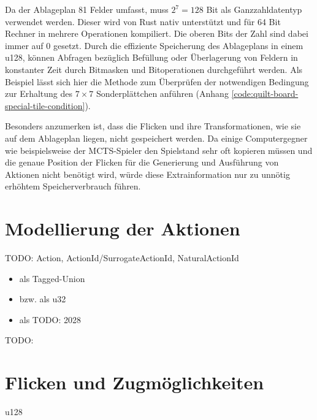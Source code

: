 Da der Ablageplan 81 Felder umfasst, muss $2^7=128$ Bit als Ganzzahldatentyp verwendet werden. Dieser wird von Rust nativ unterstützt und für 64 Bit Rechner in mehrere Operationen kompiliert. Die oberen Bits der Zahl sind dabei immer auf 0 gesetzt. Durch die effiziente Speicherung des Ablageplans in einem \ac{u128}, können Abfragen bezüglich Befüllung oder Überlagerung von Feldern in konstanter Zeit durch Bitmasken und Bitoperationen durchgeführt werden. Als Beispiel lässt sich hier die Methode zum Überprüfen der notwendigen Bedingung zur Erhaltung des $7\times 7$ Sonderplättchen anführen (Anhang \ref{code:quilt-board-special-tile-condition}).

Besonders anzumerken ist, dass die Flicken und ihre Transformationen, wie sie auf dem Ablageplan liegen, nicht gespeichert werden. Da einige Computergegner wie beispielsweise der \ac{MCTS}-Spieler den Spielstand sehr oft kopieren müssen und die genaue Position der Flicken für die Generierung und Ausführung von Aktionen nicht benötigt wird, würde diese Extrainformation nur zu unnötig erhöhtem Speicherverbrauch führen.

\section{Modellierung der Aktionen}

TODO: Action, ActionId/SurrogateActionId, NaturalActionId

\begin{itemize}
    \item {} als Tagged-Union
    \item {} bzw.  als \ac{u32}
    \item {} als TODO: 2028
\end{itemize}

TODO:



\section{Flicken und Zugmöglichkeiten}

\acs{u128}

\pagebreak


